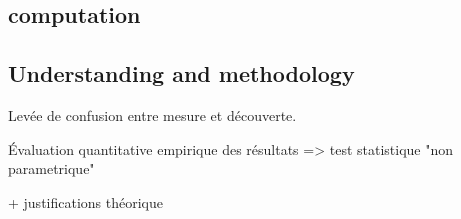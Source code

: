 \subsection{computation} %
\label{sub:computation}

\subsection{Understanding and methodology} %
\label{sub:understanding_and_methodology}

Levée de confusion entre mesure et découverte.

Évaluation quantitative empirique des résultats => test statistique "non parametrique"

+ justifications théorique
